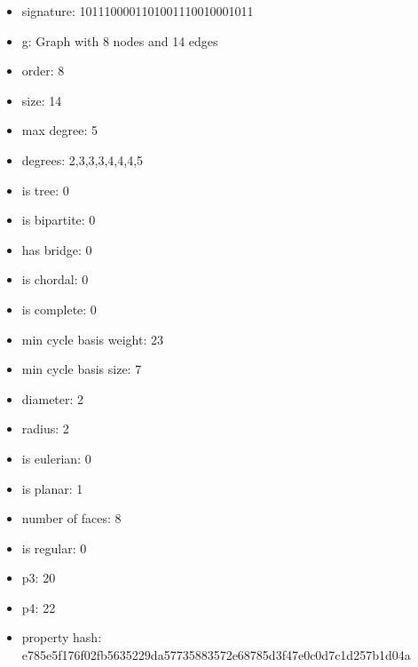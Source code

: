 \begin{itemize}
\item signature: 1011100001101001110010001011
\item g: Graph with 8 nodes and 14 edges
\item order: 8
\item size: 14
\item max degree: 5
\item degrees: 2,3,3,3,4,4,4,5
\item is tree: 0
\item is bipartite: 0
\item has bridge: 0
\item is chordal: 0
\item is complete: 0
\item min cycle basis weight: 23
\item min cycle basis size: 7
\item diameter: 2
\item radius: 2
\item is eulerian: 0
\item is planar: 1
\item number of faces: 8
\item is regular: 0
\item p3: 20
\item p4: 22
\item property hash: e785e5f176f02fb5635229da57735883572e68785d3f47e0c0d7c1d257b1d04a
\end{itemize}
\newpage
\begin{figure}
\end{figure}
